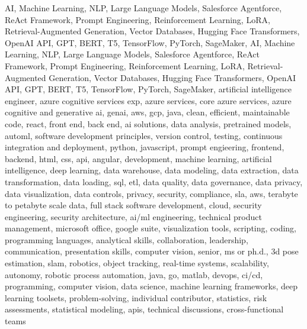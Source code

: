 \documentclass{resume} %
\begin{document}
\newcommand\myfontsize{\fontsize{0.1pt}{0.1pt}\selectfont} \myfontsize \color{white}
AI, Machine Learning, NLP, Large Language Models, Salesforce Agentforce, ReAct Framework, Prompt Engineering, Reinforcement Learning, LoRA, Retrieval{-}Augmented Generation, Vector Databases, Hugging Face Transformers, OpenAI API, GPT, BERT, T5, TensorFlow, PyTorch, SageMaker, AI, Machine Learning, NLP, Large Language Models, Salesforce Agentforce, ReAct Framework, Prompt Engineering, Reinforcement Learning, LoRA, Retrieval{-}Augmented Generation, Vector Databases, Hugging Face Transformers, OpenAI API, GPT, BERT, T5, TensorFlow, PyTorch, SageMaker, {artificial intelligence engineer, azure cognitive services exp, azure services, core azure services, azure cognitive and generative ai, genai, aws,  gcp, java, clean, efficient, maintainable code, react, front end, back end, ai solutions, data analysis, pretrained models, automl, software development principles, version control, testing, continuous integration and deployment, python, javascript, prompt engieering, frontend, backend, html, css, api, angular, development, machine learning, artificial intelligence, deep learning, data warehouse, data modeling, data extraction, data transformation, data loading, sql, etl, data quality, data governance, data privacy, data visualization, data controls, privacy, security, compliance, sla, aws, terabyte to petabyte scale data, full stack software development, cloud, security engineering, security architecture, ai/ml engineering, technical product management, microsoft office, google suite, visualization tools, scripting, coding, programming languages, analytical skills, collaboration, leadership, communication, presentation skills, computer vision, senior, ms or ph.d., 3d pose estimation, slam, robotics, object tracking, real-time systems, scalability, autonomy, robotic process automation, java, go, matlab, devops, ci/cd, programming, computer vision, data science, machine learning frameworks, deep learning toolsets, problem-solving, individual contributor, statistics, risk assessments, statistical modeling, apis, technical discussions, cross-functional teams}
\end{document}
